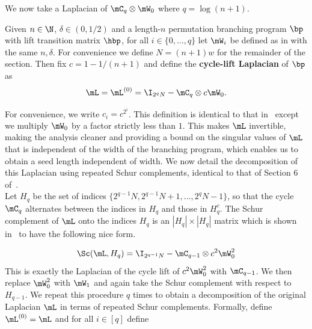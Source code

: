 \documentclass{toc}
\begin{document}
We now take a Laplacian of $\mC_q\otimes \mW_0$ where $q=\log(n+1)$. 
\begin{definition}\label{def:cycleDecomp}
Given $n\in \N$, $\delta\in(0,1/2)$ and a length-$n$ permutation branching program $\bp$ with lift transition matrix $\hbp$, for all $i\in \{0,\dots,q\}$ let $\mW_i$ be defined as in  with the same $n,\delta$. For convenience we define $N=(n+1)w$ for the remainder of the section. Then fix $c=1-1/(n+1)$ and define the \textbf{cycle-lift Laplacian} of $\bp$ as
$$\mL=\mL^{(0)}=\I_{2^qN}-\mC_q\otimes c\mW_0.$$
\end{definition}
For convenience, we write $c_i=c^{2^i}$. This definition is identical to that in~\cite{AhmadinejadKeMuPeSiVa19} except we multiply $\mW_0$ by a factor strictly less than $1$. This makes $\mL$ invertible, making the analysis cleaner and providing a bound on the singular values of $\mL$ that is independent of the width of the branching program, which enables us to obtain a seed length independent of width. We now detail the decomposition of this Laplacian using repeated Schur complements, identical to that of Section 6 of~\cite{AhmadinejadKeMuPeSiVa19}.\\

Let $H_q$ be the set of indices $\{2^{q-1}N,2^{q-1}N+1,\dots ,2^q N-1\}$, so that the cycle $\mC_q$ alternates between the indices in $H_q$ and those in $H^c_q$. The Schur complement of $\mL$ onto the indices $H_q$ is an $|H_q|\times|H_q|$ matrix which is shown in~\cite{AhmadinejadKeMuPeSiVa19} to have the following nice form. %

\[\Sc(\mL,H_q)=\I_{2^{q-1}N}-\mC_{q-1}\otimes c^2\mW_0^2\]
This is exactly the Laplacian of the cycle lift of $c^2\mW_0^2$ with $\mC_{q-1}$. We then replace $\mW_0^2$ with $\mW_1$ and again take the Schur complement with respect to $H_{q-1}$. We repeat this procedure $q$ times to obtain a decomposition of the original Laplacian $\mL$ in terms of repeated Schur complements. Formally, define $\mL^{(0)}=\mL$ and for all $i\in [q]$ define
\end{document}
